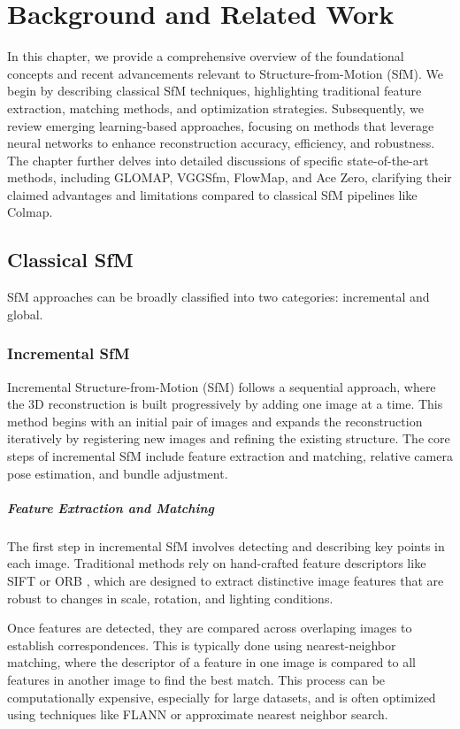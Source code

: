 \chapter{Background and Related Work}\label{chap:related_work}

In this chapter, we provide a comprehensive overview of the foundational concepts and recent advancements relevant to Structure-from-Motion (SfM).
We begin by describing classical SfM techniques, highlighting traditional feature extraction, matching methods, and optimization strategies. 
Subsequently, we review emerging learning-based approaches, focusing on methods that leverage neural networks to enhance reconstruction accuracy, efficiency, and robustness. 
The chapter further delves into detailed discussions of specific state-of-the-art methods, including GLOMAP, VGGSfm, FlowMap, and Ace Zero, 
clarifying their claimed advantages and limitations compared to classical SfM pipelines like Colmap.

\section{Classical SfM}
SfM approaches can be broadly classified into two categories: incremental and global.

\subsection{Incremental SfM}
Incremental Structure-from-Motion (SfM) follows a sequential approach, where the 3D reconstruction is built progressively by adding one image at a time. 
This method begins with an initial pair of images and expands the reconstruction iteratively by registering new images and refining the existing structure. 
The core steps of incremental SfM include feature extraction and matching, relative camera pose estimation, and bundle adjustment.

\paragraph{Feature Extraction and Matching}
The first step in incremental SfM involves detecting and describing key points in each image. 
Traditional methods rely on hand-crafted feature descriptors like SIFT \cite{Lowe2004DistinctiveIF} or ORB \cite{rublee2011orb}, 
which are designed to extract distinctive image features that are robust to changes in scale, rotation, and lighting conditions.

Once features are detected, they are compared across overlaping images to establish correspondences.
This is typically done using nearest-neighbor matching, where the descriptor of a feature in one image is compared to all features in another image to find the best match.
This process can be computationally expensive, especially for large datasets, and is often optimized using techniques like FLANN \cite{muja2009fast} or approximate nearest neighbor search.

